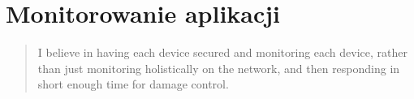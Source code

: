 \chapter[Monitorowania aplikacji]{Monitorowanie aplikacji}
\label{chapter:monitoring}

\begin{quote}
    I believe in having each device secured and monitoring each device, rather than just
    monitoring holistically on the network, and then responding in short enough time for damage control.
\end{quote}




